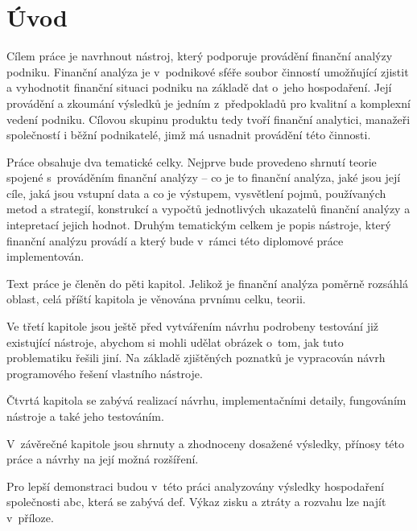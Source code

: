 \chapter{Úvod}
Cílem práce je navrhnout nástroj, který podporuje provádění finanční analýzy podniku. Finanční analýza je v~podnikové sféře soubor činností umožňující zjistit a vyhodnotit finanční situaci podniku na základě dat o~jeho hospodaření. Její provádění a zkoumání výsledků je jedním z~předpokladů pro kvalitní a komplexní vedení podniku. Cílovou skupinu produktu tedy tvoří finanční analytici, manažeři společností i běžní podnikatelé, jimž má usnadnit provádění této činnosti.

Práce obsahuje dva tematické celky. Nejprve bude provedeno shrnutí teorie spojené s~prováděním finanční analýzy -- co je to finanční analýza, jaké jsou její cíle, jaká jsou vstupní data a co je výstupem, vysvětlení pojmů, používaných metod a strategií, konstrukcí a vypočtů jednotlivých ukazatelů finanční analýzy a intepretací jejich hodnot. 
Druhým tematickým celkem je popis nástroje, který finanční analýzu provádí a který bude v~rámci této diplomové práce implementován. 

Text práce je členěn do pěti kapitol. Jelikož je finanční analýza poměrně rozsáhlá oblast, celá příští kapitola je věnována prvnímu celku, teorii. 

Ve třetí kapitole jsou ještě před vytvářením návrhu podrobeny testování již existující nástroje, abychom si mohli udělat obrázek o~tom, jak tuto problematiku řešili jiní. Na základě zjištěných poznatků je vypracován návrh programového řešení vlastního nástroje.

Čtvrtá kapitola se zabývá realizací návrhu, implementačními detaily, fungováním nástroje a také jeho testováním. 

V~závěrečné kapitole jsou shrnuty a zhodnoceny dosažené výsledky, přínosy této práce a návrhy na její možná rozšíření.

Pro lepší demonstraci budou v~této práci analyzovány výsledky hospodaření společnosti abc, která se zabývá def. Výkaz zisku a ztráty a rozvahu lze najít v~příloze.
























